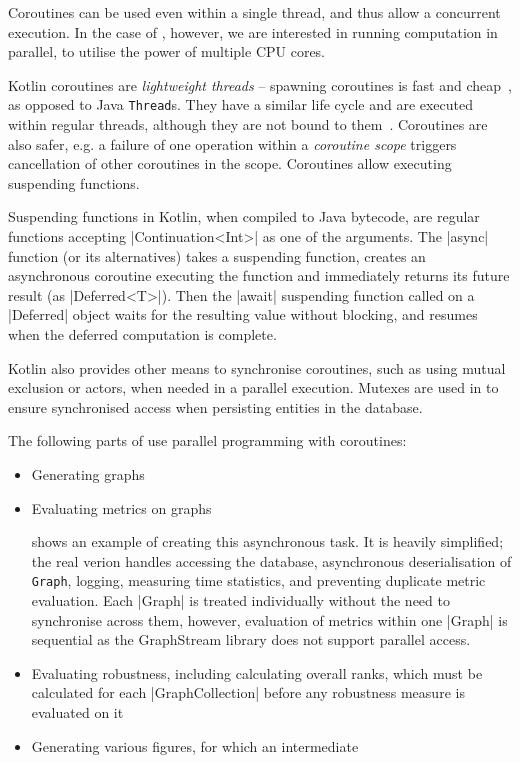 Coroutines can be used even within a single thread, and thus allow a concurrent execution.
In the case of \graffs, however, we are interested in running computation in parallel, to utilise the power of multiple CPU cores.

Kotlin coroutines are \textsl{lightweight threads} -- spawning coroutines is fast and cheap~\cite{AriasFunctionalKotlinExtend2018}, as opposed to Java \texttt{Thread}s.
They have a similar life cycle and are executed within regular threads, although they are not bound to them~\cite{TorresLearningConcurrencyKotlin2018}.
Coroutines are also safer, e.g. a failure of one operation within a \textsl{coroutine scope} triggers cancellation of other coroutines in the scope.
Coroutines allow executing suspending functions.

Suspending functions in Kotlin, when compiled to Java bytecode, are regular functions accepting |Continuation<Int>| as one of the arguments.
The |async| function (or its alternatives) takes a suspending function, creates an asynchronous coroutine executing the function and immediately returns its future result (as |Deferred<T>|).
Then the |await| suspending function called on a |Deferred| object waits for the resulting value without blocking, and resumes when the deferred computation is complete.



Kotlin also provides other means to synchronise coroutines, such as using mutual exclusion or actors, when needed in a parallel execution.
Mutexes are used in \graffs to ensure synchronised access when persisting entities in the database.


The following parts of \graffs use parallel programming with coroutines:
\begin{itemize}[topsep=5pt]
    \item Generating graphs
    \item Evaluating metrics on graphs

     shows an example of creating this asynchronous task.
    It is heavily simplified; the real verion handles accessing the database, asynchronous deserialisation of \texttt{Graph}, logging, measuring time statistics, and preventing duplicate metric evaluation.
    Each |Graph| is treated individually without the need to synchronise across them, however, evaluation of metrics within one |Graph| is sequential as the GraphStream library does not support parallel access.
    \item Evaluating robustness, including calculating overall ranks, which must be calculated for each |GraphCollection| before any robustness measure is evaluated on it
    \item Generating various figures, for which an intermediate
\end{itemize}


